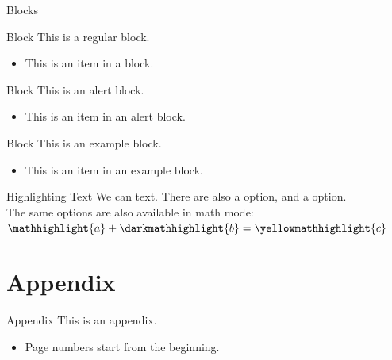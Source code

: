 \documentclass[aspectratio=169]{beamer} %
\begin{document}
\begin{frame}{Blocks}
    \begin{block}{Block}
        This is a regular block.
        \begin{itemize}
            \item This is an item in a block.
        \end{itemize}
    \end{block}
    
    \begin{alertblock}{Block}
        This is an alert block.
        \begin{itemize}
            \item This is an item in an alert block.
        \end{itemize}
    \end{alertblock}
    
    \begin{exampleblock}{Block}
        This is an example block.
        \begin{itemize}
            \item This is an item in an example block.
        \end{itemize}
    \end{exampleblock}
\end{frame}


\begin{frame}{Highlighting Text}
    We can  text. There are also a  option, and a  option.\\
    The same options are also available in math mode: $\mathhighlight{a} + \darkmathhighlight{b} = \yellowmathhighlight{c}$
\end{frame}


\appendix

\section{Appendix}

\begin{frame}{Appendix}
    This is an appendix.
    \begin{itemize}
        \item Page numbers start from the beginning.
    \end{itemize}
\end{frame}
\end{document}
